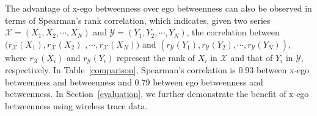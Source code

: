 The advantage of x-ego betweenness over ego betweenness can also be observed in terms of Spearman's rank correlation, which indicates, given two series $\mathcal{X}=(X_1, X_2, \cdots, X_N)$ and $\mathcal{Y}=(Y_1, Y_2, \cdots, Y_N)$, the correlation between $(r_{\mathcal{X}}(X_1), r_{\mathcal{X}}(X_2)$ $, \cdots, r_{\mathcal{X}}(X_N))$ and $(r_{\mathcal{Y}}(Y_1), r_{\mathcal{Y}}(Y_2), \cdots, r_{\mathcal{Y}}(Y_N))$, where $r_{\mathcal{X}}(X_i)$ and $r_{\mathcal{Y}}(Y_i)$ represent the rank of $X_i$ in $\mathcal{X}$ and that of $Y_i$ in $\mathcal{Y}$, respectively.
In Table~\ref{comparison}, Spearman's correlation is 0.93 between x-ego betweenness and betweenness and 0.79 between ego betweenness and betweenness.
In Section~\ref{evaluation}, we further demonstrate the benefit of x-ego betweenness using wireless trace data.


